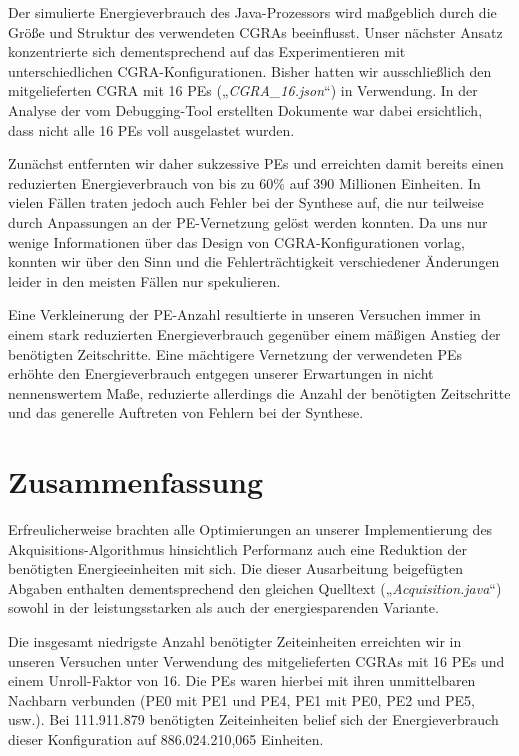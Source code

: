 \documentclass[parskip,
							 oneside,
							 11pt,
							 noheadingspace,
							 accentcolor=tud1d,
							 bigchapter,
							 colorback]{tudreport}
\begin{document}
Der simulierte Energieverbrauch des Java-Prozessors wird maßgeblich durch die Größe und Struktur des verwendeten CGRAs beeinflusst. Unser nächster Ansatz konzentrierte sich dementsprechend auf das Experimentieren mit unterschiedlichen CGRA-Konfigurationen. Bisher hatten wir ausschließlich den mitgelieferten CGRA mit 16 PEs („\emph{CGRA\_16.json}“) in Verwendung. In der Analyse der vom Debugging-Tool erstellten Dokumente war dabei ersichtlich, dass nicht alle 16 PEs voll ausgelastet wurden.

Zunächst entfernten wir daher sukzessive PEs und erreichten damit bereits einen reduzierten Energieverbrauch von bis zu 60\% auf 390 Millionen Einheiten. In vielen Fällen traten jedoch auch Fehler bei der Synthese auf, die nur teilweise durch Anpassungen an der PE-Vernetzung gelöst werden konnten. Da uns nur wenige Informationen über das Design von CGRA-Konfigurationen vorlag, konnten wir über den Sinn und die Fehlerträchtigkeit verschiedener Änderungen leider in den meisten Fällen nur spekulieren.

Eine Verkleinerung der PE-Anzahl resultierte in unseren Versuchen immer in einem stark reduzierten Energieverbrauch gegenüber einem mäßigen Anstieg der benötigten Zeitschritte. Eine mächtigere Vernetzung der verwendeten PEs erhöhte den Energieverbrauch entgegen unserer Erwartungen in nicht nennenswertem Maße, reduzierte allerdings die Anzahl der benötigten Zeitschritte und das generelle Auftreten von Fehlern bei der Synthese.

\chapter{Zusammenfassung}
Erfreulicherweise brachten alle Optimierungen an unserer Implementierung des Akquisitions-Algorithmus hinsichtlich Performanz auch eine Reduktion der benötigten Energieeinheiten mit sich. Die dieser Ausarbeitung beigefügten Abgaben enthalten dementsprechend den gleichen Quelltext („\emph{Acquisition.java}“) sowohl in der leistungsstarken als auch der energiesparenden Variante.

Die insgesamt niedrigste Anzahl benötigter Zeiteinheiten erreichten wir in unseren Versuchen unter Verwendung des mitgelieferten CGRAs mit 16 PEs und einem Unroll-Faktor von 16. Die PEs waren hierbei mit ihren unmittelbaren Nachbarn verbunden (PE0 mit PE1 und PE4, PE1 mit PE0, PE2 und PE5, usw.). Bei 111.911.879 benötigten Zeiteinheiten belief sich der Energieverbrauch dieser Konfiguration auf 886.024.210,065 Einheiten.
\end{document}
